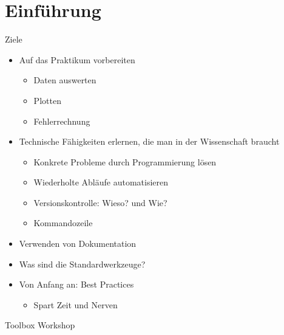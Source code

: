 \section{Einführung}

\begin{frame}{Ziele}
  \begin{itemize}
    \item Auf das Praktikum vorbereiten
      \begin{itemize}
        \item Daten auswerten
        \item Plotten
        \item Fehlerrechnung
      \end{itemize}
    \item Technische Fähigkeiten erlernen, die man in der Wissenschaft braucht
      \begin{itemize}
        \item Konkrete Probleme durch Programmierung lösen
        \item Wiederholte Abläufe automatisieren
        \item Versionskontrolle: Wieso? und Wie?
        \item Kommandozeile
      \end{itemize}
    \item Verwenden von Dokumentation
    \item Was sind die Standardwerkzeuge?
    \item Von Anfang an: Best Practices
      \begin{itemize}
        \item Spart Zeit und Nerven
      \end{itemize}
  \end{itemize}
\end{frame}

\begin{frame}
  \vspace*{1cm}
  \begin{center}
    \Huge Toolbox Workshop
  \end{center}
\end{frame}


